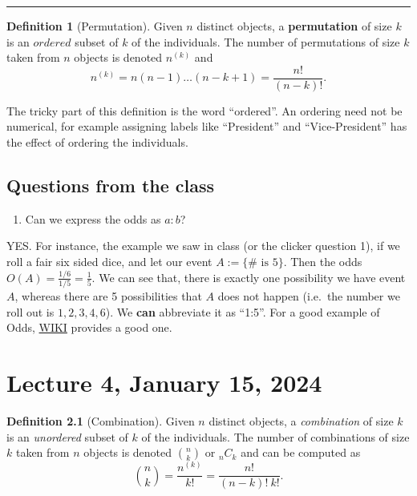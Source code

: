 \documentclass[
]{book}
\providecommand{\tightlist}{%
  \setlength{\itemsep}{0pt}\setlength{\parskip}{0pt}}
\theoremstyle{definition}
\newtheorem{definition}{Definition}[chapter]
\theoremstyle{definition}
\theoremstyle{definition}
\theoremstyle{definition}
\theoremstyle{remark}
\begin{document}
\begin{center}\rule{0.5\linewidth}{0.5pt}\end{center}

\begin{definition}[Permutation]
Given \(n\) distinct objects, a \textbf{permutation} of size \(k\) is an \(ordered\) subset of \(k\) of the individuals. The number of permutations of size \(k\) taken from \(n\) objects is denoted \(n^{(k)}\) and
\[
n^{(k)}=n(n-1)\dots (n-k+1) =\frac{n!}{(n-k)!}.
\]
\end{definition}

The tricky part of this definition is the word ``ordered''. An ordering need not be numerical, for example assigning labels like ``President'' and ``Vice-President'' has the effect of ordering the individuals.

\hypertarget{questions-from-the-class-1}{%
\section{Questions from the class}\label{questions-from-the-class-1}}

\begin{enumerate}
\def\labelenumi{\arabic{enumi}.}
\tightlist
\item
  Can we express the odds as \(a:b\)?
\end{enumerate}

YES. For instance, the example we saw in class (or the clicker question 1), if we roll a fair six sided dice, and let our event \(A:=\{\text{# is } 5 \}\). Then the odds \(O(A)=\frac{1/6}{1/5}=\frac{1}{5}\). We can see that, there is exactly one possibility we have event \(A\), whereas there are 5 possibilities that \(A\) does not happen (i.e.~the number we roll out is \(1,2,3,4,6\)). We \textbf{can} abbreviate it as ``1:5''. For a good example of Odds, \href{https://en.wikipedia.org/wiki/Odds}{WIKI} provides a good one.

\hypertarget{lecture-4-january-15-2024}{%
\chapter{Lecture 4, January 15, 2024}\label{lecture-4-january-15-2024}}

\begin{definition}[Combination]
Given \(n\) distinct objects, a \emph{combination} of size \(k\) is an \emph{unordered} subset of \(k\) of the individuals. The number of combinations of size \(k\) taken from \(n\) objects is denoted \({n \choose k}\) or \({}_n C_k\) and can be computed as
\[
{n \choose k}=\frac{n^{(k)}}{k!}=\frac{n!}{(n-k)!\ k!}.
\]
\end{definition}
\end{document}
